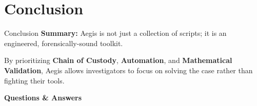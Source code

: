 \documentclass[aspectratio=169]{beamer}
\begin{document}
\section{Conclusion}

\begin{frame}{Conclusion}
    \textbf{Summary:}
    Aegis is not just a collection of scripts; it is an engineered, forensically-sound toolkit. 
    
    \vspace{0.5cm}
    By prioritizing \textbf{Chain of Custody}, \textbf{Automation}, and \textbf{Mathematical Validation}, Aegis allows investigators to focus on solving the case rather than fighting their tools.
    
    \vspace{1cm}
    \begin{center}
        \Large \textbf{Questions \& Answers}
    \end{center}
\end{frame}
\end{document}
